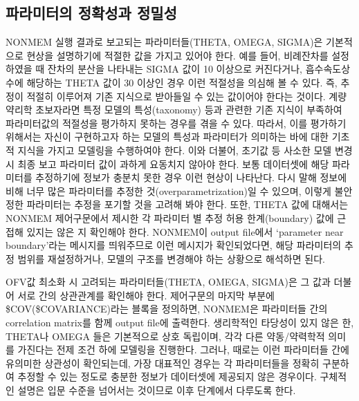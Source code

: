 \documentclass[
  11pt,
  krantz2,
  a4paper]{krantz}
\theoremstyle{definition}
\theoremstyle{definition}
\theoremstyle{definition}
\theoremstyle{remark}
\begin{document}
\hypertarget{uxd30cuxb77cuxbbf8uxd130uxc758-uxc815uxd655uxc131uxacfc-uxc815uxbc00uxc131}{%
\subsection{파라미터의 정확성과 정밀성}\label{uxd30cuxb77cuxbbf8uxd130uxc758-uxc815uxd655uxc131uxacfc-uxc815uxbc00uxc131}}

NONMEM 실행 결과로 보고되는 파라미터들(THETA, OMEGA, SIGMA)은 기본적으로 현상을 설명하기에 적절한 값을 가지고 있어야 한다. 예를 들어, 비례잔차를 설정하였을 때 잔차의 분산을 나타내는 SIGMA 값이 10 이상으로 커진다거나, 흡수속도상수에 해당하는 THETA 값이 30 이상인 경우 이런 적절성을 의심해 볼 수 있다. 즉, 추정이 적절히 이루어져 기존 지식으로 받아들일 수 있는 값이어야 한다는 것이다. 계량약리학 초보자라면 특정 모델의 특성(taxonomy) 등과 관련한 기존 지식이 부족하여 파라미터값의 적절성을 평가하지 못하는 경우를 겪을 수 있다. 따라서, 이를 평가하기 위해서는 자신이 구현하고자 하는 모델의 특성과 파라미터가 의미하는 바에 대한 기초적 지식을 가지고 모델링을 수행하여야 한다. 이와 더불어, 초기값 등 사소한 모델 변경 시 최종 보고 파라미터 값이 과하게 요동치지 않아야 한다. 보통 데이터셋에 해당 파라미터를 추정하기에 정보가 충분치 못한 경우 이런 현상이 나타난다. 다시 말해 정보에 비해 너무 많은 파라미터를 추정한 것(overparametrization)일 수 있으며, 이렇게 불안정한 파라미터는 추정을 포기할 것을 고려해 봐야 한다. 또한, THETA 값에 대해서는 NONMEM 제어구문에서 제시한 각 파라미터 별 추정 허용 한계(boundary) 값에 근접해 있지는 않은 지 확인해야 한다. NONMEM이 output file에서 `parameter near boundary'라는 메시지를 띄워주므로 이런 메시지가 확인되었다면, 해당 파라미터의 추정 범위를 재설정하거나, 모델의 구조를 변경해야 하는 상황으로 해석하면 된다.

OFV값 최소화 시 고려되는 파라미터들(THETA, OMEGA, SIGMA)은 그 값과 더불어 서로 간의 상관관계를 확인해야 한다. 제어구문의 마지막 부분에 \$COV(\$COVARIANCE)라는 블록을 정의하면, NONMEM은 파라미터들 간의 correlation matrix를 함께 output file에 출력한다. 생리학적인 타당성이 있지 않은 한, THETA나 OMEGA 들은 기본적으로 상호 독립이며, 각각 다른 약동/약력학적 의미를 가진다는 전제 조건 하에 모델링을 진행한다. 그러나, 때로는 이런 파라미터들 간에 유의미한 상관성이 확인되는데, 가장 대표적인 경우는 각 파라미터들을 정확히 구분하여 추정할 수 있는 정도로 충분한 정보가 데이터셋에 제공되지 않은 경우이다. 구체적인 설명은 입문 수준을 넘어서는 것이므로 이후 단계에서 다루도록 한다.
\end{document}
